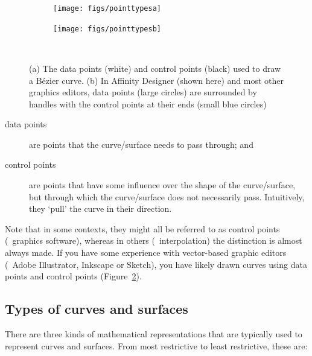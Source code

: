 \begin{figure}
\centering
\begin{subfigure}{0.5\linewidth}
\texttt{[image: figs/pointtypesa]}
\caption{}%
\label{subfig:pointtypesa}
\end{subfigure}%
\begin{subfigure}{0.4\linewidth}
\texttt{[image: figs/pointtypesb]}
\caption{}%
\label{subfig:pointtypesb}
\end{subfigure}\\
\caption{(a) The data points (white) and control points (black) used to draw a B\'ezier curve.
(b) In Affinity Designer (shown here) and most other graphics editors, data points (large circles) are surrounded by handles with the control points at their ends (small blue circles)}%
\label{fig:pointtypes}
\end{figure}

\begin{description}
\item[data points] are points that the curve/surface needs to pass through; and
\item[control points] are points that have some influence over the shape of the curve/surface, but through which the curve/surface does not necessarily pass. Intuitively, they `pull' the curve in their direction.
\end{description}

Note that in some contexts, they might all be referred to as control points (\eg\ graphics software), whereas in others (\eg\ interpolation) the distinction is almost always made.
If you have some experience with vector-based graphic editors (\eg\ Adobe Illustrator, Inkscape or Sketch), you have likely drawn curves using data points and control points (Figure~\ref{subfig:pointtypesb}).

\subsection{Types of curves and surfaces}

There are three kinds of mathematical representations that are typically used to represent curves and surfaces.
From most restrictive to least restrictive, these are:

